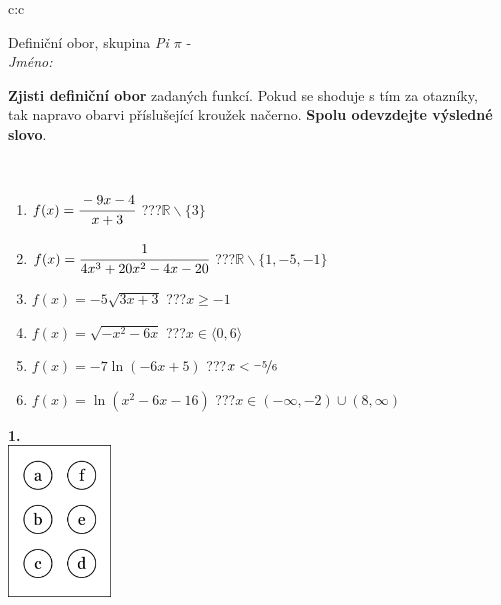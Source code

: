 \documentclass[10pt]{report}
\begin{document}
\begin{tabular}{c:c}
\begin{minipage}[c][104.5mm][t]{0.5\linewidth}
\begin{center}
\vspace{7mm}
{\huge Definiční obor, skupina \textit{Pi $\pi$} -}\\[5mm]
\textit{Jméno:}\phantom{xxxxxxxxxxxxxxxxxxxxxxxxxxxxxxxxxxxxxxxxxxxxxxxxxxxxxxxxxxxxxxxxx}\\[5mm]
\begin{minipage}{0.95\linewidth}
\begin{center}
\textbf{Zjisti definiční obor} zadaných funkcí. Pokud se shoduje s tím za otazníky,\\tak napravo obarvi příslušející kroužek načerno. \textbf{Spolu odevzdejte výsledné slovo}.
\end{center}
\end{minipage}
\\[1mm]
\begin{minipage}{0.79\linewidth}
\begin{center}
\begin{varwidth}{\linewidth}
\begin{enumerate}
\normalsizerrr
\item $f(x)=\cfrac{-9x-4}{x+3}$\quad \dotfill\; ???\;\dotfill \quad $\mathbb{R}\smallsetminus\{3\}$
\item $f(x)=\cfrac{1}{4x^3+20x^2-4x-20}$\quad \dotfill\; ???\;\dotfill \quad $\mathbb{R}\smallsetminus\{1,-5,-1\}$
\item $f(x)=-5\sqrt{3x+3}$\quad \dotfill\; ???\;\dotfill \quad $x\geq-1$
\item $f(x)=\sqrt{-x^2-6x}$\quad \dotfill\; ???\;\dotfill \quad $x\in\langle0 , 6\rangle$
\item $f(x)=-7\ln{(-6x+5)}$\quad \dotfill\; ???\;\dotfill \quad $x<\nicefrac{-5}{6}$
\item $f(x)=\ln{(x^2-6x-16)}$\quad \dotfill\; ???\;\dotfill \quad $x\in(-\infty , -2)\cup(8 , \infty)$
\end{enumerate}
\end{varwidth}
\end{center}
\end{minipage}
\begin{minipage}{0.20\linewidth}
\begin{center}
{\Huge\bfseries 1.} \\[2mm]
\includegraphics[height=40mm]{../images/braille.png}

\end{center}
\end{minipage}
\end{center}
\end{minipage}
\end{tabular}
\end{document}
